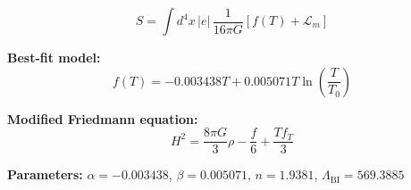 
\begin{equation}
  S = \int d^4x \, |e| \, \frac{1}{16\pi G} \left[ f(T) + \mathcal{L}_m \right]
\end{equation}

\textbf{Best-fit model:}
\begin{equation}
  f(T) = -0.003438 T + 0.005071 T \ln\!\left(\frac{T}{T_0}\right)
\end{equation}

\textbf{Modified Friedmann equation:}
\begin{equation}
  H^2 = \frac{8\pi G}{3} \rho - \frac{f}{6} + \frac{T f_T}{3}
\end{equation}

\textbf{Parameters:}
$\alpha = -0.003438$, \quad
$\beta = 0.005071$, \quad
$n = 1.9381$, \quad
$\Lambda_{\text{BI}} = 569.3885$